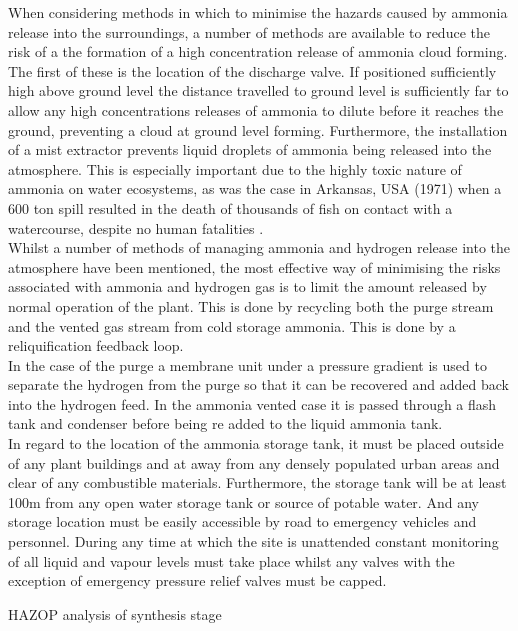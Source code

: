 {When considering methods in which to minimise the hazards caused by ammonia release into the surroundings, a number of methods are available to reduce the risk of a the formation of a high concentration release of ammonia cloud forming. The first of these is the location of the discharge valve. If positioned sufficiently high above ground level the distance travelled to ground level is sufficiently far to allow any high concentrations releases of ammonia to dilute before it reaches the ground, preventing a cloud at ground level forming. Furthermore, the installation of a mist extractor prevents liquid droplets of ammonia being released into the atmosphere. This is especially important due to the highly toxic nature of ammonia on  water ecosystems, as was the case in Arkansas, USA (1971) when a 600 ton spill resulted in the death of thousands of fish on contact with a watercourse, despite no human fatalities \cite{Ojha2010}. 
\\
Whilst a number of methods of managing ammonia and hydrogen release into the atmosphere have been mentioned, the most effective way of minimising the risks associated with ammonia and hydrogen gas is to limit the amount released by normal operation of the plant. This is done by recycling both the purge stream and the vented gas stream from cold storage ammonia. This is done by a reliquification feedback loop.
\\
In the case of the purge a membrane unit under a pressure gradient  is used to separate the hydrogen from the purge so that it can be recovered and added back into the hydrogen feed. In the ammonia vented case it is passed through a flash tank and condenser before being re added to the liquid ammonia tank.
\\
In regard to the location of the ammonia storage tank, it must be placed outside of any plant buildings and at away from any densely populated urban areas and clear of any combustible materials. Furthermore, the storage tank will be at least 100m from any open water storage tank or source of potable water. And any storage location must be easily accessible by road to emergency vehicles and personnel. During any time at which the site is unattended constant monitoring of all liquid and vapour levels must take place whilst any valves with the exception of emergency pressure relief valves must be capped.
\newpage
{\renewcommand{\arraystretch}{0.95}
\begin{landscape}
\begin{table}
	\centering
	\caption{HAZOP analysis of synthesis stage}

\end{table}
\end{landscape}}}
